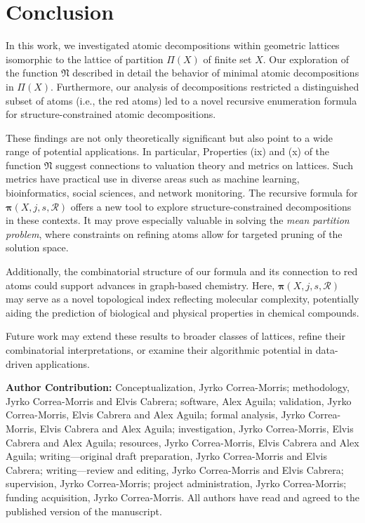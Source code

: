 \documentclass[12pt]{extarticle}
\begin{document}
\section*{Conclusion}
In this work, we investigated atomic decompositions within geometric lattices isomorphic to the lattice of partition $\Pi(X)$ of finite set $X$. Our exploration of the function $\mathfrak{N}$ described in detail the behavior of minimal atomic decompositions in $\Pi(X)$. Furthermore, our analysis of decompositions restricted a distinguished subset of atoms (i.e., the red atoms) led to a novel recursive enumeration formula for structure-constrained atomic decompositions. 

These findings are not only theoretically significant but also point to a wide range of potential applications. In particular, Properties (ix) and (x) of the function $\mathfrak{N}$ suggest connections to valuation theory and  metrics on lattices. Such metrics have practical use in diverse areas such as machine learning, bioinformatics, social sciences, and network monitoring. The recursive formula for $\bm{\pi}(X,j,s,\mathcal{R})$ offers a new tool to explore structure-constrained decompositions in these contexts. It may prove especially valuable in solving the \emph{mean partition problem}, where constraints on refining atoms allow for targeted pruning of the solution space.

Additionally, the combinatorial structure of our formula and its connection to red atoms could support advances in graph-based chemistry. Here, $\bm{\pi}(X,j,s,\mathcal{R})$ may serve as a novel topological index reflecting molecular complexity, potentially aiding the prediction of biological and physical properties in chemical compounds.

Future work may extend these results to broader classes of lattices, refine their combinatorial interpretations, or examine their algorithmic potential in data-driven applications.

\noindent\textbf{Author Contribution: }Conceptualization, Jyrko Correa-Morris; methodology, Jyrko Correa-Morris and Elvis Cabrera; software, Alex Aguila; validation, Jyrko Correa-Morris, Elvis Cabrera and Alex Aguila; formal analysis, Jyrko Correa-Morris, Elvis Cabrera and Alex Aguila; investigation, Jyrko Correa-Morris, Elvis Cabrera and Alex Aguila; resources, Jyrko Correa-Morris, Elvis Cabrera and Alex Aguila; writing---original draft preparation, Jyrko Correa-Morris and Elvis Cabrera; writing---review and editing, Jyrko Correa-Morris and Elvis Cabrera; supervision, Jyrko Correa-Morris; project administration, Jyrko Correa-Morris; funding acquisition, Jyrko Correa-Morris. All authors have read and agreed to the published version of the manuscript.
\end{document}
